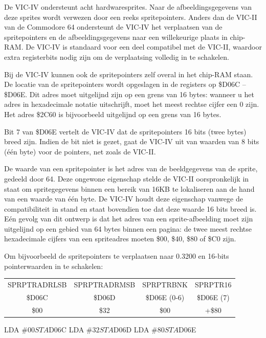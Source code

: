 De VIC-IV ondersteunt acht hardwaresprites. Naar de afbeeldingsgegevens van deze sprites wordt verwezen door een reeks spritepointers. Anders dan de VIC-II van de Commodore 64 ondersteunt de VIC-IV het verplaatsen van de spritepointers en de afbeeldingsgegevens naar een willekeurige plaats in chip-RAM. De VIC-IV is standaard voor een deel compatibel met de VIC-II, waardoor extra registerbits nodig zijn om de verplaatsing volledig in te schakelen.

Bij de VIC-IV kunnen ook de spritepointers zelf overal in het chip-RAM staan. De locatie van de spritepointers wordt opgeslagen in de registers op \$D06C -- \$D06E. Dit adres moet uitgelijnd zijn op een grens van 16 bytes: wanneer u het adres in hexadecimale notatie uitschrijft, moet het meest rechtse cijfer een 0 zijn. Het adres \$2C60 is bijvoorbeeld uitgelijnd op een grens van 16 bytes.

Bit 7 van \$D06E vertelt de VIC-IV dat de spritepointers 16 bits (twee bytes) breed zijn. Indien de bit niet is gezet, gaat de VIC-IV uit van waarden van 8 bits (één byte) voor de pointers, net zoals de VIC-II.

De waarde van een spritepointer is het adres van de beeldgegevens van de sprite, gedeeld door 64. Deze ongewone eigenschap stelde de VIC-II oorspronkelijk in staat om spritegegevens binnen een bereik van 16KB te lokaliseren aan de hand van een waarde van één byte. De VIC-IV houdt deze eigenschap vanwege de compatibiliteit in stand en staat bovendien toe dat deze waarde 16 bits breed is. Eén gevolg van dit ontwerp is dat het adres van een sprite-afbeelding moet zijn uitgelijnd op een gebied van 64 bytes binnen een pagina: de twee meest rechtse hexadecimale cijfers van een spriteadres moeten \$00, \$40, \$80 of \$C0 zijn.

Om bijvoorbeeld de spritepointers te verplaatsen naar 0.3200 en 16-bits pointerwaarden in te schakelen:

\begin{center}
\begin{tabular}{|c|c|c|c|}
\hline
SPRPTRADRLSB & SPRPTRADRMSB & SPRPTRBNK & SPRPTR16 \\\$D06C & \$D06D & \$D06E (0-6) & \$D06E (7) \\
\hline
\$00 & \$32 & \$00 & +\$80 \\
\hline
\end{tabular}
\end{center}

\begin{asmcode}
LDA #$00
STA $D06C
LDA #$32
STA $D06D
LDA #$80
STA $D06E
\end{asmcode}

